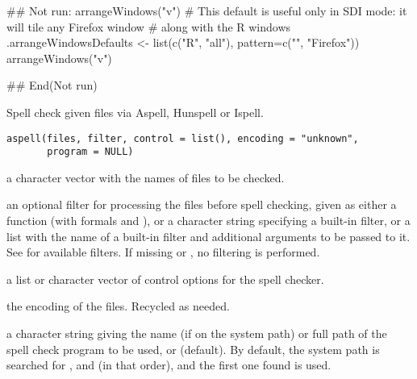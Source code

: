 %
\begin{Examples}
\begin{ExampleCode}
## Not run: 
arrangeWindows("v")
# This default is useful only in SDI mode:  it will tile any Firefox window 
# along with the R windows
.arrangeWindowsDefaults <- list(c("R", "all"), pattern=c("", "Firefox"))
arrangeWindows("v")

## End(Not run)
\end{ExampleCode}
\end{Examples}
%
\begin{Description}\relax
Spell check given files via Aspell, Hunspell or Ispell.
\end{Description}
%
\begin{Usage}
\begin{verbatim}
aspell(files, filter, control = list(), encoding = "unknown",
       program = NULL)
\end{verbatim}
\end{Usage}
%
\begin{Arguments}
\begin{ldescription}
\item[\code{files}] a character vector with the names of files to be checked.
\item[\code{filter}] an optional filter for processing the files before spell
checking, given as either a function (with formals  and
), or a character string specifying a built-in
filter, or a list with the name of a built-in filter and additional
arguments to be passed to it.  See  for available
filters.  If missing or , no filtering is performed.
\item[\code{control}] a list or character vector of control options for the
spell checker.
\item[\code{encoding}] the encoding of the files.  Recycled as needed.
\item[\code{program}] a character string giving the name (if on the system
path) or full path of the spell check program to be used, or
 (default).  By default, the system path is searched for
,  and  (in that
order), and the first one found is used.
\end{ldescription}
\end{Arguments}
%
